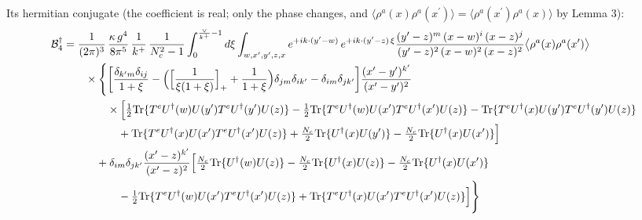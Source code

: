 \documentclass[10pt]{article}
\begin{document}
\noindent Its hermitian conjugate (the coefficient is real; only the phase changes, and $\langle\rho^{a}(x)\rho^{a}(x^{\prime})\rangle=\langle\rho^{a}(x^{\prime})\rho^{a}(x)\rangle$ by Lemma 3):
\begin{align}
\mathcal{B}_{4}^{\dagger}&=\frac{1}{(2\pi)^{3}}\,\frac{\kappa\,g^{4}}{8\pi^{5}}\,\frac{1}{k^{+}}\,\frac{1}{N_{c}^{2}-1}\int_{0}^{\frac{\vee}{k^{+}}-1}d\xi\int_{w,x',y',z,x}e^{+ik\cdot(y'-w)}\,e^{+ik\cdot(y'-z)\,\xi}\frac{(y'-z)^{m}\,(x-w)^{i}\,(x-z)^{j}}{(y'-z)^{2}\,(x-w)^{2}\,(x-z)^{2}}\big\langle\rho^{a}(x)\rho^{a}(x')\big\rangle\notag\\
&\qquad\times\Bigg\{\bigg[\frac{\delta_{k'm}\delta_{ij}}{1+\xi}-\Big(\Big[\frac{1}{\xi(1+\xi)}\Big]_{+}+\frac{1}{1+\xi}\Big)\delta_{jm}\delta_{ik'}-\delta_{im}\delta_{jk'}\bigg]\frac{(x'-y')^{k'}}{(x'-y')^{2}}\notag\\
&\qquad\qquad\times\Big[\tfrac12{\rm Tr}\{T^{e}U^{\dagger}(w)U(y')T^{e}U^{\dagger}(y')U(z)\}-\tfrac12{\rm Tr}\{T^{e}U^{\dagger}(w)U(x')T^{e}U^{\dagger}(x')U(z)\}-{\rm Tr}\{T^{e}U^{\dagger}(x)U(y')T^{e}U^{\dagger}(y')U(z)\}\notag\\
&\qquad\qquad\quad+{\rm Tr}\{T^{e}U^{\dagger}(x)U(x')T^{e}U^{\dagger}(x')U(z)\}+\tfrac{N_{c}}{2}{\rm Tr}\{U^{\dagger}(x)U(y')\}-\tfrac{N_{c}}{2}{\rm Tr}\{U^{\dagger}(x)U(x')\}\Big]\notag\\
&\qquad\quad+\delta_{im}\delta_{jk'}\frac{(x'-z)^{k'}}{(x'-z)^{2}}\Big[\tfrac{N_{c}}{2}{\rm Tr}\{U^{\dagger}(w)U(z)\}-\tfrac{N_{c}}{2}{\rm Tr}\{U^{\dagger}(x)U(z)\}-\tfrac{N_{c}}{2}{\rm Tr}\{U^{\dagger}(x)U(x')\}\notag\\
&\qquad\qquad\quad-\tfrac12{\rm Tr}\{T^{e}U^{\dagger}(w)U(x')T^{e}U^{\dagger}(x')U(z)\}+{\rm Tr}\{T^{e}U^{\dagger}(x)U(x')T^{e}U^{\dagger}(x')U(z)\}\Big]\Bigg\}
\end{align}
\end{document}
